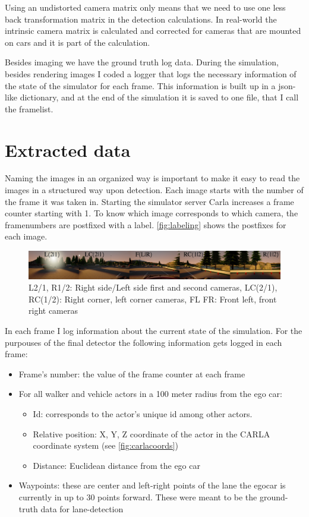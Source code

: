 Using an undistorted camera matrix only means that we need to use one less back
transformation matrix in the detection calculations. In real-world the intrinsic
camera matrix is calculated and corrected for cameras that are mounted on cars
and it is part of the calculation.

Besides imaging we have the ground truth log data. During the simulation,
besides rendering images I coded a logger that logs the necessary information of
the state of the simulator for each frame. This information is built up in a
json-like dictionary, and at the end of the simulation it is saved to one file,
that I call the framelist.

\section{Extracted data}

Naming the images in an organized way is important to make it easy to read the
images in a structured way upon detection. Each image starts with the number of
the frame it was taken in. Starting the simulator server Carla increases a
frame counter starting with 1. To know which image corresponds to which camera,
the framenumbers are postfixed with a label. \autoref{fig:labeling} shows the
postfixes for each image.

\begin{figure}[!ht]
    \centering
    \includegraphics[width=150mm, keepaspectratio]{figures/labeling.jpg}
    \caption{L2/1, R1/2: Right side/Left side first and second cameras, LC(2/1), RC(1/2): Right corner, left corner cameras, FL FR: Front left, front right cameras}
    \label{fig:labeling}
\end{figure}

In each frame I log information about the current state of the simulation. For
the purpouses of the final detector the following information gets logged in each frame:
\begin{itemize}
    \item Frame's number: the value of the frame counter at each frame
    \item For all walker and vehicle actors in a 100 meter radius from the ego car:
          \begin{itemize}
              \item Id: corresponds to the actor's unique id among other actors.
              \item Relative position: X, Y, Z coordinate of the actor in the CARLA
                    coordinate system (see \autoref{fig:carlacoords})
              \item Distance: Euclidean distance from the ego car
          \end{itemize}
    \item Waypoints: these are center and left-right points of the lane the egocar is currently in up
          to 30 points forward. These were meant to be the ground-truth data for
          lane-detection
\end{itemize}

